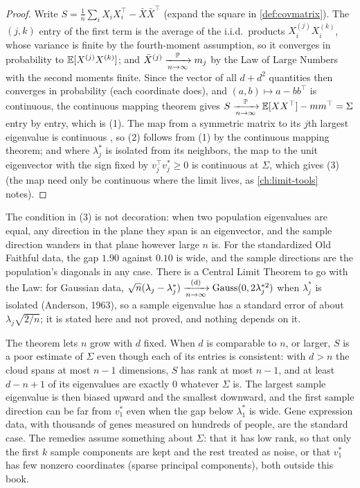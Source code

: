 \begin{proof}
Write $S = \frac1n\sum_iX_iX_i^\top - \bar{X}\bar{X}^\top$ (expand the square in \cref{def:covmatrix}).
The $(j, k)$ entry of the first term is the average of the i.i.d.\ products $X_i^{(j)}X_i^{(k)}$, whose variance is finite by the fourth-moment assumption, so it converges in probability to $\operatorname*{\mathbb{E}}[X^{(j)}X^{(k)}]$; and $\bar{X}^{(j)} \xrightarrow [n \to \infty ]{\mathbb{P}} m_j$ by the Law of Large Numbers with the second moments finite.
Since the vector of all $d + d^2$ quantities then converges in probability (each coordinate does), and $(a, b) \mapsto a - bb^\top$ is continuous, the continuous mapping theorem gives $S \xrightarrow [n \to \infty ]{\mathbb{P}} \operatorname*{\mathbb{E}}[XX^\top] - mm^\top = \Sigma$ entry by entry, which is (1).
The map from a symmetric matrix to its $j$th largest eigenvalue is continuous , so (2) follows from (1) by the continuous mapping theorem; and where $\lambda_j^*$ is isolated from its neighbors, the map to the unit eigenvector with the sign fixed by $v_j^\top v_j^* \geq 0$ is continuous at $\Sigma$, which gives (3) (the map need only be continuous where the limit lives, as \cref{ch:limit-tools} notes).
\end{proof}

The condition in (3) is not decoration: when two population eigenvalues are equal, any direction in the plane they span is an eigenvector, and the sample direction wanders in that plane however large $n$ is.
For the standardized Old Faithful data, the gap $1.90$ against $0.10$ is wide, and the sample directions are the population's diagonals in any case.
There is a Central Limit Theorem to go with the Law: for Gaussian data, $\sqrt{n}(\lambda_j - \lambda_j^*) \xrightarrow [n \to \infty ]{\text{(d)}} \text{Gauss}(0, 2\lambda_j^{*2})$ when $\lambda_j^*$ is isolated (Anderson, 1963), so a sample eigenvalue has a standard error of about $\lambda_j\sqrt{2/n}$; it is stated here and not proved, and nothing depends on it.

\begin{pitfall}
The theorem lets $n$ grow with $d$ fixed. When $d$ is comparable to $n$, or larger, $S$ is a poor estimate of $\Sigma$ even though each of its entries is consistent: with $d > n$ the cloud spans at most $n - 1$ dimensions, $S$ has rank at most $n - 1$, and at least $d - n + 1$ of its eigenvalues are exactly $0$ whatever $\Sigma$ is. The largest sample eigenvalue is then biased upward and the smallest downward, and the first sample direction can be far from $v_1^*$ even when the gap below $\lambda_1^*$ is wide. Gene expression data, with thousands of genes measured on hundreds of people, are the standard case. The remedies assume something about $\Sigma$: that it has low rank, so that only the first $k$ sample components are kept and the rest treated as noise, or that $v_1^*$ has few nonzero coordinates (sparse principal components), both outside this book.
\end{pitfall}

